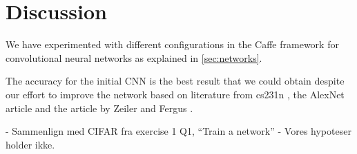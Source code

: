 \graphicspath{{Chapters/Project/}}

\section{Discussion} %
\label{sec:discussion}

We have experimented with different configurations in the Caffe framework for convolutional neural
networks as explained in \autoref{sec:networks}.  
 
 
The accuracy for the initial CNN is the best result that we could obtain despite
our effort to improve the network based on literature from cs231n \cite{cs231n},
the AlexNet article\cite{AlexNet} and the article by Zeiler and Fergus
\cite{ZeilerFergus}.


- Sammenlign med CIFAR fra exercise 1 Q1, ``Train a network'' 
- Vores hypoteser holder ikke. 


